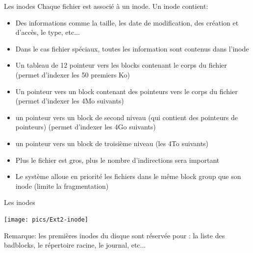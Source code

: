 \begin{frame}[fragile=singleslide]{Les inodes}
  Chaque fichier est associé à un inode. Un inode contient:
  \begin{itemize}
  \item Des  informations comme la  taille, les date  de modification,
    des création et d'accès, le type, etc...
  \item  Dans le  cas fichier  spéciaux, toutes  les  information sont
    contenus dans l'inode
  \item Un tableau  de 12 pointeur vers les  blocks contenant le corps
    du fichier (permet d'indexer les 50 premiers Ko)
  \item  Un pointeur  vers un  block contenant  des pointeurs  vers le
    corps du fichier (permet d'indexer les 4Mo suivants)
  \item un pointeur  vers un block de second  niveau (qui contient des
    pointeurs de pointeurs) (permet d'indexer les 4Go suivants)
  \item  un  pointeur vers  un  block  de  troisième niveau  (les  4To
    suivants)
  \item Plus  le fichier est  gros, plus le nombre  d'indirections sera
    important
  \item Le système alloue en  priorité les fichiers dans le même block
    group que son inode (limite la fragmentation)
  \end{itemize}
\end{frame}

\begin{frame}[fragile=singleslide]{Les inodes}
  \begin{center}
    \texttt{[image: pics/Ext2-inode]}
  \end{center}
  Remarque: les  premières inodes  du disque sont  réservée pour  : la
  liste des badblocks, le répertoire racine, le journal, etc...
\end{frame}

